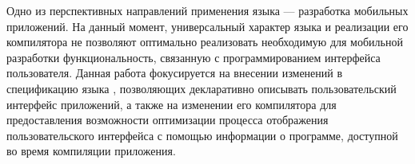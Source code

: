 Одно из перспективных направлений применения языка  ---
разработка мобильных приложений. На данный момент, универсальный характер
языка и реализации его компилятора не позволяют оптимально реализовать
необходимую для мобильной разработки функциональность, связанную с
программированием интерфейса пользователя.  Данная работа фокусируется на
внесении изменений в спецификацию языка , позволяющих
декларативно описывать пользовательский интерфейс приложений, а также на
изменении  его компилятора для предоставления возможности оптимизации 
процесса отображения пользовательского интерфейса с помощью информации о
программе, доступной во время компиляции приложения.